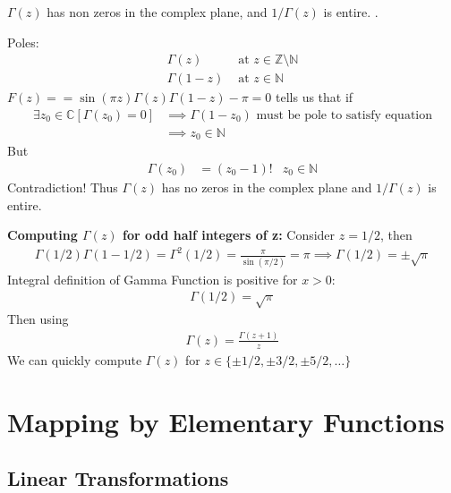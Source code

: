 \documentclass[12pt, english]{book}
\makeatletter
\renewenvironment{proof}[1][\proofname]{\par
	\pushQED{\qed}%
	\normalfont \topsep6\p@\@plus6\p@\relax
	\list{}{%
		\settowidth{\leftmargin}{\itshape\proofname:\hskip\labelsep}%
		\setlength{\labelwidth}{0pt}%
		\setlength{\itemindent}{-\leftmargin}%
		}%
	\item[\hskip\labelsep\itshape#1\@addpunct{:}]\ignorespaces
	}{\popQED\endlist\@endpefalse}
\makeatother
\begin{document}
	\begin{lemma}
		\label{Gamma Function has no zeros in Complex Plane Lemma - Complex}
		\(\Gamma(z)\) has non zeros in the complex plane, and \(1/\Gamma(z)\) is entire. . 
	\end{lemma}
	\begin{proof}
		Poles:
		\begin{align*}
			\Gamma(z) 	&\text{ at } z \in \mathbb{Z} \setminus \mathbb{N} \\
			\Gamma(1-z) &\text{ at } z \in \mathbb{N}
		\end{align*}
		\(F(z) = = \sin(\pi z) \Gamma(z) \Gamma(1-z) - \pi = 0\) tells us that if
		\begin{align*}
			\exists z_0 \in \mathbb{C} [\Gamma(z_0) = 0] 
			&\implies \Gamma(1-z_0) \text{ must be pole to satisfy equation} \\
			&\implies z_0 \in \mathbb{N}
		\end{align*}
		But
		\begin{align*}
			\Gamma(z_0) &= (z_0 - 1)! & z_0 \in \mathbb{N}
		\end{align*}
		Contradiction! Thus \(\Gamma(z)\) has no zeros in the complex plane and \(1/\Gamma(z)\) is entire.
	\end{proof}

	\textbf{Computing \(\Gamma(z)\) for odd half integers of z:} \newline
	Consider \(z = 1/2\), then
	\begin{align*}
		\Gamma(1/2) \Gamma(1-1/2) = \Gamma^{2}(1/2) = \frac{\pi}{\sin(\pi/2)} = \pi \implies \Gamma(1/2) = \pm \sqrt{\pi}
	\end{align*}
	Integral definition of Gamma Function is positive for \(x > 0\):
	\begin{align*}
		\Gamma(1/2) = \sqrt{\pi}
	\end{align*}
	Then using 
	\begin{align*}
		\Gamma(z) = \frac{\Gamma(z+1)}{z}
	\end{align*}
	We can quickly compute \(\Gamma(z)\) for \(z \in \{\pm 1/2, \pm 3/2, \pm 5/2, \ldots\}\)

	\chapter{Mapping by Elementary Functions} \label{Mapping by Elementary Functions Chapter - Complex}
	
	\section{Linear Transformations} \label{Linear Transformations Section - Complex}
	
\end{document}
